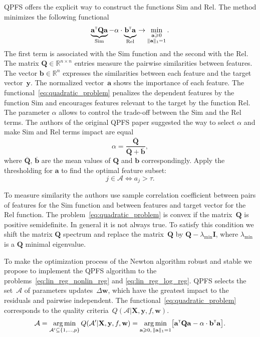\documentclass[a4paper,12pt]{article}
\renewcommand{\geq}{\ensuremath{\geqslant}}
\theoremstyle{plain} %
\theoremstyle{definition} %
\theoremstyle{remark} %
\newcommand{\ba}{\mathbf{a}}
\newcommand{\bb}{\mathbf{b}}
\newcommand{\bw}{\mathbf{w}}
\newcommand{\by}{\mathbf{y}}
\newcommand{\cA}{\mathcal{A}}
\newcommand{\bQ}{\mathbf{Q}}
\newcommand{\bbR}{\mathbb{R}}
\newcommand{\bX}{\mathbf{X}}
\newcommand{\T}{{\text{\tiny\sffamily\upshape\mdseries T}}}
\newcommand{\argmin}{\mathop{\arg \min}\limits}
\begin{document}
	QPFS offers the explicit way to construct the functions Sim and Rel. 
	The method minimizes the following functional
	\begin{equation}
		\underbrace{\ba^{\T} \bQ \ba}_{\text{Sim}} - \alpha \cdot \underbrace{\vphantom{()} \mathbf{b}^{\T} \ba}_{\text{Rel}} \rightarrow \min_{\substack{\ba \geq 0 \\ \|\ba\|_1=1}}.
		\label{eq:quadratic_problem}
	\end{equation}
	The first term is associated with the Sim function and the second with the Rel. 
  	The matrix $\bQ \in \bbR^{n \times n}$ entries measure the pairwise similarities between features. 
  	The vector $\mathbf{b} \in \bbR^n$ expresses the similarities between each feature and the target vector~$\by$.
  	The normalized vector~$\ba$ shows the importance of each feature. 
  	The functional~\eqref{eq:quadratic_problem} penalizes the dependent features by the function Sim and encourages features relevant to the target by the function Rel. 
  	The parameter $\alpha$ allows to control the trade-off between the Sim and the Rel terms.
  	The authors of the original QPFS paper suggested the way to select $\alpha$ and make Sim and Rel terms impact are equal
  	\begin{equation*}
  		\alpha = \frac{\overline{\bQ}}{\overline{\bQ} + \overline{\bb}},
  	\end{equation*}
  	where $\overline{\bQ}$, $\overline{\bb}$ are the mean values of $\bQ$ and $\bb$ correspondingly.
  	Apply the thresholding for $\ba$ to find the optimal feature subset:
  	\[
  		j \in \mathcal{A} \Leftrightarrow a_j > \tau.
  	\]
  	
  	To measure similarity the authors use sample correlation coefficient between pairs of features for the Sim function and between features and target vector for the Rel function.
  	The problem~\eqref{eq:quadratic_problem} is convex if the matrix~$\bQ$ is positive semidefinite. In general it is not always true. 
  	To satisfy this condition we shift the matrix $\bQ$ spectrum and replace the matrix~$\bQ$ by $\bQ - \lambda_{\text{min}} \mathbf{I}$, where $\lambda_{\text{min}} $ is a $\bQ$ minimal eigenvalue.
  	
  	To make the optimization process of the Newton algorithm robust and stable we propose to implement the QPFS algorithm to the problems~\eqref{eq:lin_reg_nonlin_reg} and \eqref{eq:lin_reg_log_reg}. 
  	QPFS selects the set~$\cA$ of parameters updates~$\Delta \bw$, which have the greatest impact to the residuals and pairwise independent.
  	The functional~\eqref{eq:quadratic_problem} corresponds to the quality criteria~$Q(\cA | \bX, \by, f, \bw)$.
	\begin{equation}
		\cA = \argmin_{\cA' \subseteq \{1, \dots, p\}} Q(\cA' | \bX, \by, f, \bw) = \argmin_{\ba \geq 0, \, \|\ba\|_1=1} \bigl[\ba^{\T} \bQ \ba - \alpha \cdot \mathbf{b}^{\T} \ba \bigr].
	\end{equation}
  	
\end{document}
